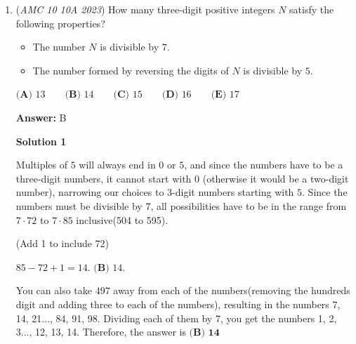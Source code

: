 \begin{enumerate}
 



\textbf{Solution 8}

Let $s$ be the length of the shorter leg, $l$ the longer leg, and $t$ the desired ratio. We have:
 \[s^2+l^2=2 \text{ and } \frac{1}{2}sl=\frac{1}{4}\]The former dividing the latter gives:
 \[t+\frac{1}{t}=4\]Solve this for $t$.Multiply by $t$:
 \[t^2+1=4t\]Subtract -4t to get a quadratic:
 \[t^2-4t+1=0\] Use the quadratic formula to get:
 \[2 \pm \sqrt{3}\]And since the smaller one is the first one, the solution has to be less than 1, so the answer is the one less than 1, the answer is$\boxed{\textbf{(C) }2-\sqrt3}$



	\item (\textit{AMC 10 10A 2023}) How many three-digit positive integers $N$ satisfy the following properties?


 
            \begin{itemize}
        \item The number $N$ is divisible by $7$.
            \end{itemize}
            
            \begin{itemize}
        \item The number formed by reversing the digits of $N$ is divisible by $5$.
            \end{itemize}
            $\textbf{(A) } 13 \qquad \textbf{(B) } 14 \qquad \textbf{(C) } 15 \qquad \textbf{(D) } 16 \qquad \textbf{(E) } 17$

 \textbf{Answer: }B



\textbf{Solution 1}

Multiples of $5$ will always end in $0$ or $5$, and since the numbers have to be a three-digit numbers, it cannot start with 0 (otherwise it would be a two-digit number), narrowing our choices to 3-digit numbers starting with $5$. Since the numbers must be divisible by 7, all possibilities have to be in the range from $7 \cdot 72$ to $7 \cdot 85$ inclusive(504 to 595). 

 (Add 1 to include 72)

 $85 - 72 + 1 = 14$. $\boxed{\textbf{(B) } 14}$.

 You can also take 497 away from each of the numbers(removing the hundreds digit and adding three to each of the numbers), resulting in the numbers {7, 14, 21..., 84, 91, 98}. Dividing each of them by 7, you get the numbers {1, 2, 3..., 12, 13, 14}. Therefore, the answer is $\boxed{\textbf{(B) 14}}$





\end{enumerate}
